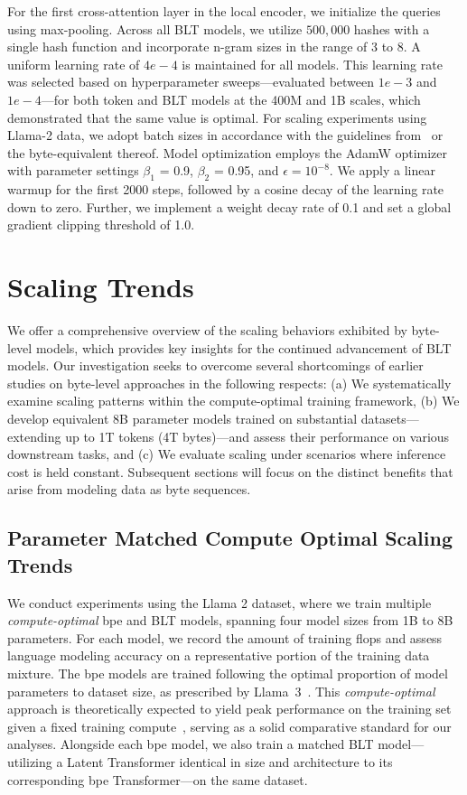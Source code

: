 For the first cross-attention layer in the local encoder, we initialize the queries using max-pooling. Across all {\textsc BLT} models, we utilize $500,000$ hashes with a single hash function and incorporate n-gram sizes in the range of 3 to 8. A uniform learning rate of $4e-4$ is maintained for all models. This learning rate was selected based on hyperparameter sweeps—evaluated between $1e-3$ and $1e-4$—for both token and {\textsc BLT} models at the 400M and 1B scales, which demonstrated that the same value is optimal. For scaling experiments using Llama-2 data, we adopt batch sizes in accordance with the guidelines from~\cite{dubey2024llama} or the byte-equivalent thereof. Model optimization employs the AdamW optimizer~\citep{adamw} with parameter settings $\beta_1$ = 0.9, $\beta_2$ = 0.95, and $\epsilon=10^{-8}$. We apply a linear warmup for the first 2000 steps, followed by a cosine decay of the learning rate down to zero. Further, we implement a weight decay rate of 0.1 and set a global gradient clipping threshold of 1.0.

\section{Scaling Trends}
\label{section:scaling}

We offer a comprehensive overview of the scaling behaviors exhibited by byte-level models, which provides key insights for the continued advancement of {\textsc BLT} models. Our investigation seeks to overcome several shortcomings of earlier studies on byte-level approaches in the following respects: (a) We systematically examine scaling patterns within the compute-optimal training framework, (b) We develop equivalent 8B parameter models trained on substantial datasets—extending up to 1T tokens (4T bytes)—and assess their performance on various downstream tasks, and (c) We evaluate scaling under scenarios where inference cost is held constant. Subsequent sections will focus on the distinct benefits that arise from modeling data as byte sequences.

\subsection{Parameter Matched Compute Optimal Scaling Trends}
\label{section:parameter-matched-scaling}
We conduct experiments using the Llama 2 dataset, where we train multiple \textit{compute-optimal} bpe and {\textsc BLT} models, spanning four model sizes from 1B to 8B parameters. For each model, we record the amount of training flops and assess language modeling accuracy on a representative portion of the training data mixture. The bpe models are trained following the optimal proportion of model parameters to dataset size, as prescribed by Llama~3~\citep{dubey2024llama}. This \textit{compute-optimal} approach is theoretically expected to yield peak performance on the training set given a fixed training compute~\citep{hoffmann2022training}, serving as a solid comparative standard for our analyses. Alongside each bpe model, we also train a matched {\textsc BLT} model—utilizing a Latent Transformer identical in size and architecture to its corresponding bpe Transformer—on the same dataset.

